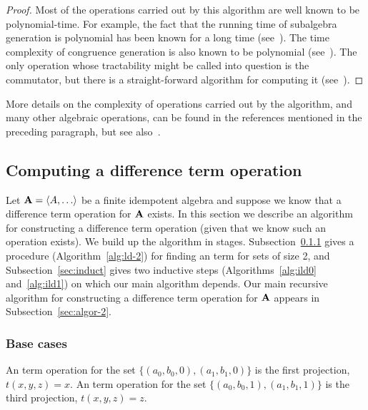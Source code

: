 \begin{proof}
    Most of the operations carried out by this algorithm are well known to be
    polynomial-time.  For example, the fact that the running time of 
    subalgebra generation is polynomial has been known for a long time (see~\cite{MR0455543}).
    The time complexity of congruence generation is also known to be polynomial
    (see~\cite{MR2470585}).  The only operation whose tractability might be
    called into question is the commutator, but there is a straight-forward
    algorithm for computing it (see~\cite{2017arXiv170302764D}).
\end{proof}


More details on the complexity of operations carried out by the algorithm, and
many other algebraic operations, can be found in the references mentioned in the preceding paragraph, but see also~\cite{MR1871085,MR1695293,Freese:2009}.

\subsection{Computing a difference term operation}
Let $\alg{A} = \<A, \dots\>$ be a finite idempotent algebra and suppose we 
know that a difference term operation for $\mathbf{A}$ exists.  In this section we
describe an algorithm for constructing a difference term operation
(given that we know such an operation exists). 
We build up the algorithm in stages. Subsection~\ref{sec:size2}
gives a procedure (Algorithm~\ref{alg:ld-2}) for finding an \ld term for sets 
of size 2, and Subsection~\ref{sec:induct} gives two inductive steps 
(Algorithms~\ref{alg:ild0} and~\ref{alg:ild1}) on which our main
algorithm depends.
Our main recursive algorithm for constructing a difference term 
operation for $\mathbf{A}$ appears in Subsection~\ref{sec:algor-2}.

\subsubsection{Base cases}
\label{sec:size2}
An \ld term operation for the set
$\{(a_0,b_0,0), (a_1, b_1, 0)\}$ is the first projection,
$t(x,y,z) = x$.
An \ld term operation for
the set $\{(a_0,b_0,1), (a_1, b_1, 1)\}$ is the third projection,
$t(x,y,z) = z$.
\begin{comment}
\footnote{Moreover, if $a_0 = b_0$, then by idempotence every ternary term $t$ 
satisfies $t(a_0, b_0, b_0) = a_0$; therefore, the third projection is an \ld 
term for the set $\{(a_0,b_0,\chi_0), (a_1, b_1, \chi_1)\}$, 
for all $\chi_0$, $\chi_1$ in $\{0,1\}$. 
Similarly, if $a_1 = b_1$, then $t(a_1, a_1, b_1) = b_1$ for all ternary $t$, 
so the third projection is an \ld term.
Therefore, we need only consider sets of the form
$\{(a_0,b_0, 0), (a_1, b_1, 1)\}$, where $a_0 \neq b_0$ and 
$a_1 \neq b_1$.  
We have relegated this observation to a footnote because it yeilds a computational 
that does not impact the overall complexity of the main algorithm.} 
\end{comment}

